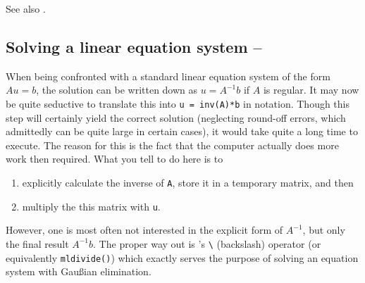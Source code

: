 See also \cite{Mathworks:2001:MIM}.



%
%


\subsection{Solving a linear equation system -- \cleansymbol\cleansymbol\fastsymbol\fastsymbol\fastsymbol}
When being confronted with a standard linear equation system of the form
$Au=b$, the solution can be written down as $u = A^{-1}b$ if $A$ is regular. It
may now be quite seductive to translate this into \lstinline!u = inv(A)*b! in
\matlab{} notation. Though this step will certainly yield the correct solution
(neglecting round-off errors, which admittedly can be quite large in certain
cases), it would take quite a long time to execute. The reason for this is the
fact that the computer actually does more work then required. What you tell
\matlab{} to do here is to
\begin{enumerate}
\item explicitly calculate the inverse of \lstinline!A!, store it in a temporary matrix, and then
\item multiply the this matrix with \lstinline!u!.
\end{enumerate}
However, one is most often not interested in the explicit form of $A^{-1}$, but
only the final result $A^{-1}b$. The proper way out is \matlab{}'s
\lstinline!\! (backslash) operator (or equivalently \lstinline!mldivide()!)
which exactly serves the purpose of solving an equation system with Gau{\ss}ian
elimination.

